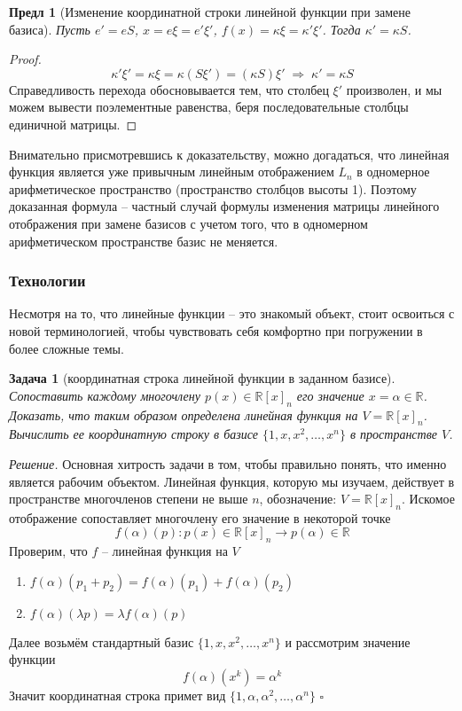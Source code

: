 \documentclass[a4paper,12pt]{article}
\newtheorem{propos}{Предл}[section]
\newtheorem*{prob}{Задача}
\newenvironment{soln}{\noindent\textit{Решение.}}{\hfill$\square$}
\begin{document}
\begin{propos}[Изменение координатной строки линейной функции при замене базиса] 
    Пусть $e' = eS$, $x = e \xi = e' \xi'$, $f(x) = \kappa \xi = \kappa' \xi'$. Тогда $\kappa' = \kappa S$. 
\end{propos}
\begin{proof}
	\[
		\kappa' \xi' = \kappa \xi = \kappa (S \xi') = (\kappa S) \xi' \; \Rightarrow \; \kappa' = \kappa S
	\]
	Справедливость перехода обосновывается тем, что столбец $\xi'$ произволен, и мы можем вывести поэлементные равенства, беря последовательные столбцы единичной матрицы.
\end{proof}

Внимательно присмотревшись к доказательству, можно догадаться, что линейная функция является уже привычным линейным отображением $L_n$ в одномерное арифметическое пространство (пространство столбцов высоты 1). Поэтому доказанная формула -- частный случай формулы изменения матрицы линейного отображения при замене базисов с учетом того, что в одномерном арифметическом пространстве базис не меняется.


\subsubsection{Технологии}

Несмотря на то, что линейные функции -- это знакомый объект, стоит освоиться с новой терминологией, чтобы чувствовать себя комфортно при погружении в более сложные темы. 

\begin{prob}[координатная строка линейной функции в заданном базисе]
	Сопоставить каждому многочлену $p(x) \in \mathbb{R}[x]_n$ его значение $x = \alpha \in \mathbb{R}$. Доказать, что таким образом определена линейная функция на $V = \mathbb{R}[x]_n$. Вычислить ее координатную строку в базисе $\{1, x, x^2, \ldots, x^n\}$ в пространстве $V$.
\end{prob}
\begin{soln}
	Основная хитрость задачи в том, чтобы правильно понять, что именно является рабочим  объектом. Линейная функция, которую мы изучаем, действует в пространстве многочленов степени не выше $n$, обозначение: $V = \mathbb{R}[x]_n$. Искомое отображение сопоставляет многочлену его значение в некоторой точке
	\[
		f(\alpha)(p): p(x) \in \mathbb{R}[x]_n \to p(\alpha) \in \mathbb{R}
	\]
	Проверим, что $f$ -- линейная функция на $V$
	\begin{enumerate}
		\item $f(\alpha)(p_1 + p_2) = f(\alpha)(p_1) + f(\alpha)(p_2)$ 
		\item $f(\alpha)(\lambda p) = \lambda f(\alpha)(p)$
	\end{enumerate}
	Далее возьмём стандартный базис $\{1, x, x^2, \ldots, x^n\}$ и рассмотрим значение функции 
	\[
		f(\alpha)(x^k) = \alpha^k
	\]
	Значит координатная строка примет вид $\{1, \alpha, \alpha^2, \ldots, \alpha^n\}$
\end{soln}
\end{document}
